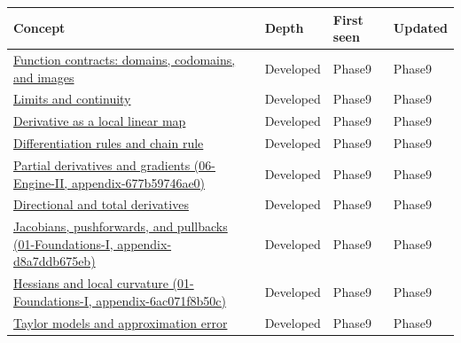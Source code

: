 {\def\LTcaptype{none} %
\begin{longtable}[]{@{}
  >{\raggedright\arraybackslash}p{}
  >{\raggedright\arraybackslash}p{}
  >{\raggedright\arraybackslash}p{}
  >{\raggedright\arraybackslash}p{}@{}}
\toprule\noalign{}
\begin{minipage}[b]{\linewidth}\raggedright
Concept
\end{minipage} & \begin{minipage}[b]{\linewidth}\raggedright
Depth
\end{minipage} & \begin{minipage}[b]{\linewidth}\raggedright
First seen
\end{minipage} & \begin{minipage}[b]{\linewidth}\raggedright
Updated
\end{minipage} \\
\midrule\noalign{}
\endhead
\bottomrule\noalign{}
\endlastfoot
\hyperref[appendix-a59658325cd6]{Function contracts: domains, codomains, and images} & Developed & Phase9 & Phase9 \\
\hyperref[appendix-fecc1847f5a3]{Limits and continuity} & Developed & Phase9 & Phase9 \\
\hyperref[appendix-7bc181935c42]{Derivative as a local linear map} & Developed & Phase9 & Phase9 \\
\hyperref[appendix-d9f70bdfbc92]{Differentiation rules and chain rule} & Developed & Phase9 & Phase9 \\
\href{../06-Engine-II/main.pdf\#nameddest=appendix-677b59746ae0}{Partial derivatives and gradients (06-Engine-II, appendix-677b59746ae0)} & Developed & Phase9 & Phase9 \\
\hyperref[appendix-e2d476574aab]{Directional and total derivatives} & Developed & Phase9 & Phase9 \\
\href{../01-Foundations-I/main.pdf\#nameddest=appendix-d8a7ddb675eb}{Jacobians, pushforwards, and pullbacks (01-Foundations-I, appendix-d8a7ddb675eb)} & Developed & Phase9 & Phase9 \\
\href{../01-Foundations-I/main.pdf\#nameddest=appendix-6ac071f8b50c}{Hessians and local curvature (01-Foundations-I, appendix-6ac071f8b50c)} & Developed & Phase9 & Phase9 \\
\hyperref[appendix-32f39e9a3738]{Taylor models and approximation error} & Developed & Phase9 & Phase9 \\

\end{longtable}}
